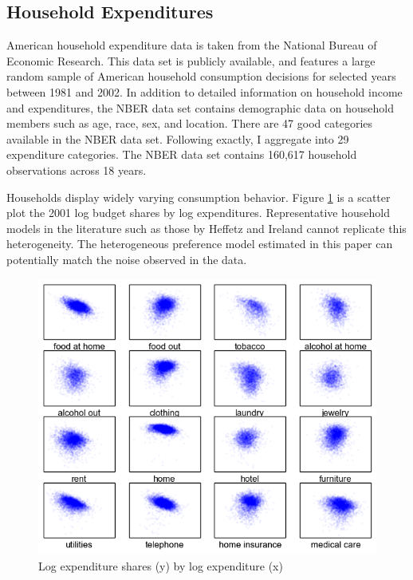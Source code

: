 \subsection{Household Expenditures}
American household expenditure data is taken from the National Bureau of Economic Research.\citep{NBERCEX2011}  This data set is publicly available, and features a large random sample of American household consumption decisions for selected years between 1981 and 2002.  In addition to detailed information on household income and expenditures, the NBER data set contains demographic data on household members such as age, race, sex, and location.
There are 47 good categories available in the NBER data set.
Following \citet{Heffetz2011} exactly,\footnotemark{} I aggregate into 29 expenditure categories.
The NBER data set contains 160,617 household observations across 18 years.

Households display widely varying consumption behavior.  Figure \ref{fig:exp_shr} is a scatter plot the 2001 log budget shares by log expenditures.  Representative household models in the literature such as those by Heffetz and Ireland cannot replicate this heterogeneity.\footnotemark{} The heterogeneous preference model estimated in this paper can potentially match the noise observed in the data.

\begin{figure}
	\centering
		\includegraphics[scale=1]{pics/shr_plot.png}
	\caption{Log expenditure shares (y) by log expenditure (x)}
	\label{fig:exp_shr}
\end{figure}

